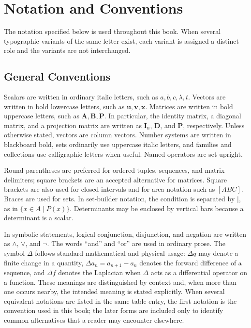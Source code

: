     \chapter*{Notation and Conventions}

    The notation specified below is used throughout this book. When several
    typographic variants of the same letter exist, each variant is assigned a
    distinct role and the variants are not interchanged.

    \section*{General Conventions}

    Scalars are written in ordinary italic letters, such as $a,b,c,\lambda,t$.
    Vectors are written in bold lowercase letters, such as
    $\mathbf{u},\mathbf{v},\mathbf{x}$. Matrices are written in bold uppercase
    letters, such as $\mathbf{A},\mathbf{B},\mathbf{P}$. In particular, the
    identity matrix, a diagonal matrix, and a projection matrix are written as
    $\mathbf{I}_n$, $\mathbf{D}$, and $\mathbf{P}$, respectively. Unless
    otherwise stated, vectors are column vectors. Number systems are written in
    blackboard bold, sets ordinarily use uppercase italic letters, and families
    and collections use calligraphic letters when useful. Named operators are
    set upright.

    Round parentheses are preferred for ordered tuples, sequences, and matrix
    delimiters; square brackets are an accepted alternative for matrices. Square
    brackets are also used for closed intervals and for area notation such as
    $[ABC]$. Braces are used for sets. In set-builder notation, the condition is
    separated by $\mid$, as in $\{x\in A\mid P(x)\}$. Determinants may be
    enclosed by vertical bars because a determinant is a scalar.

    In symbolic statements, logical conjunction, disjunction, and negation are
    written as $\land$, $\lor$, and $\neg$. The words ``and'' and ``or'' are
    used in ordinary prose. The symbol $\Delta$ follows standard mathematical
    and physical usage: $\Delta q$ may denote a finite change in a quantity,
    $\Delta a_n=a_{n+1}-a_n$ denotes the forward difference of a sequence, and
    $\Delta f$ denotes the Laplacian when $\Delta$ acts as a differential
    operator on a function. These meanings are distinguished by context and, when
    more than one occurs nearby, the intended meaning is stated explicitly.
    When several
    equivalent notations are listed in the same table entry, the first notation is
    the convention used in this book; the later forms are included only to identify
    common alternatives that a reader may encounter elsewhere.

